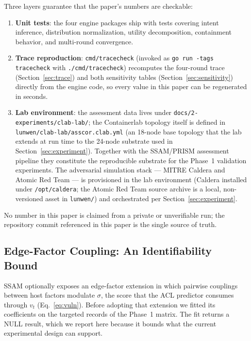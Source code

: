 \documentclass[preprints,article,accept,oneauthor]{Definitions/mdpi}
\begin{document}
Three layers guarantee that the paper's numbers are checkable:
\begin{enumerate}
\item \textbf{Unit tests}: the four engine packages ship with tests covering
      intent inference, distribution normalization, utility decomposition,
      containment behavior, and multi-round convergence.
\item \textbf{Trace reproduction}: \texttt{cmd/tracecheck} (invoked as
      \texttt{go run -tags tracecheck} with \texttt{./cmd/tracecheck})
      recomputes the four-round trace (Section~\ref{sec:trace}) and both sensitivity tables
      (Section~\ref{sec:sensitivity}) directly from the engine code, so every
      value in this paper can be regenerated in seconds.
\item \textbf{Lab environment}: the assessment data lives under
      \texttt{docs/2-experiments/clab-lab/}; the Containerlab topology itself
      is defined in \texttt{lunwen/clab-lab/asscor.clab.yml} (an 18-node base
      topology that the lab extends at run time to the 24-node substrate used
      in Section~\ref{sec:experiment}). Together with the SSAM/PRISM
      assessment pipeline they constitute the reproducible substrate for the
      Phase~1 validation experiments. The adversarial simulation stack ---
      MITRE Caldera and Atomic Red Team --- is provisioned in the lab
      environment (Caldera installed under \texttt{/opt/caldera}; the Atomic
      Red Team source archive is a local, non-versioned asset in
      \texttt{lunwen/}) and orchestrated per Section~\ref{sec:experiment}.
\end{enumerate}
No number in this paper is claimed from a private or unverifiable run; the
repository commit referenced in this paper is the single source of truth.

\subsection{Edge-Factor Coupling: An Identifiability Bound}
\label{sec:edge-null}

SSAM optionally exposes an edge-factor extension in which pairwise couplings
between host factors modulate $\sigma$, the score that the ACL predictor
consumes through $v_t$ (Eq.~\ref{eq:vuln}). Before adopting that extension we
fitted its coefficients on the targeted records of the Phase~1 matrix. The
fit returns a NULL result, which we report here because it bounds what the
current experimental design can support.
\end{document}
